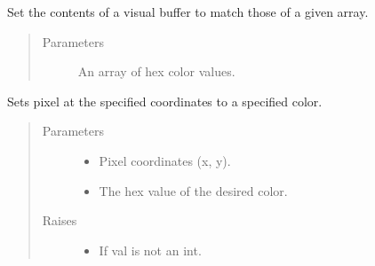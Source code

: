 \documentclass[letterpaper,10pt,english,openany,oneside]{sphinxmanual}
\begin{document}
\begin{fulllineitems}
\begin{fulllineitems}
\end{fulllineitems}



\begin{fulllineitems}

\pysigstartsignatures
{}
\pysigstopsignatures
\sphinxAtStartPar
Set the contents of a visual buffer to match those of a given array.
\begin{quote}\begin{description}
\item[{Parameters}] \leavevmode
\sphinxAtStartPar
{} \textendash{} An array of hex color values.

\end{description}\end{quote}

\end{fulllineitems}



\begin{fulllineitems}

\pysigstartsignatures
{}
\pysigstopsignatures
\sphinxAtStartPar
Sets pixel at the specified coordinates to a specified color.
\begin{quote}\begin{description}
\item[{Parameters}] \leavevmode\begin{itemize}
\item {} 
\sphinxAtStartPar
{} \textendash{} Pixel coordinates (x, y).

\item {} 
\sphinxAtStartPar
{} \textendash{} The hex value of the desired color.

\end{itemize}

\item[{Raises}] \leavevmode\begin{itemize}
\item {} 
\sphinxAtStartPar
{} \textendash{} If val is not an int.


\end{itemize}
\end{description}
\end{quote}
\end{fulllineitems}
\end{fulllineitems}
\end{document}
